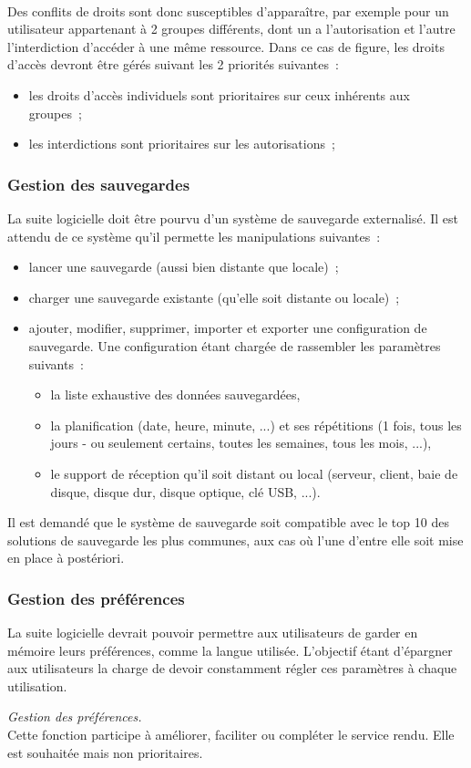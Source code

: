 \\
Des conflits de droits sont donc susceptibles d'apparaître, par exemple pour un utilisateur appartenant à 2 groupes différents, dont un a l'autorisation et l'autre l'interdiction d'accéder à une même ressource. Dans ce cas de figure, les droits d'accès devront être gérés suivant les 2 priorités suivantes~:
\begin{itemize}
	\item les droits d'accès individuels sont prioritaires sur ceux inhérents aux groupes~;
	\item les interdictions sont prioritaires sur les autorisations~;
\end{itemize}

\subsubsection{Gestion des sauvegardes}
La suite logicielle doit être pourvu d'un système de sauvegarde externalisé. Il est attendu de ce système qu'il permette les manipulations suivantes~:
\begin{itemize}
	\item lancer une sauvegarde (aussi bien distante que locale)~;
	\item charger une sauvegarde existante (qu'elle soit distante ou locale)~;
	\item ajouter, modifier, supprimer, importer et exporter une configuration de sauvegarde. Une configuration étant chargée de rassembler les paramètres suivants~:
	\begin{itemize}
		\item la liste exhaustive des données sauvegardées,
		\item la planification (date, heure, minute, ...) et ses répétitions (1 fois, tous les jours - ou seulement certains, toutes les semaines, tous les mois, ...),
		\item le support de réception qu'il soit distant ou local (serveur, client, baie de disque, disque dur, disque optique, clé USB, ...).
	\end{itemize}
\end{itemize}
\begin{constraint}
Il est demandé que le système de sauvegarde soit compatible avec le top 10 des solutions de sauvegarde les plus communes, aux cas où l'une d'entre elle soit mise en place à postériori.
\end{constraint}

\subsubsection{Gestion des préférences}
La suite logicielle devrait pouvoir permettre aux utilisateurs de garder en mémoire leurs préférences, comme la langue utilisée. L'objectif étant d'épargner aux utilisateurs la charge de devoir constamment régler ces paramètres à chaque utilisation.
\begin{notation}
\emph{Gestion des préférences.}
\\
Cette fonction participe à améliorer, faciliter ou compléter le service rendu. Elle est souhaitée mais non prioritaires.
\end{notation}

